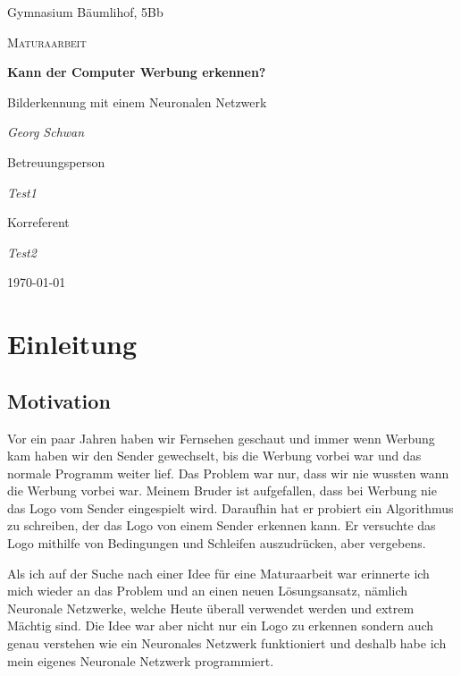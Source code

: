 \documentclass[12pt,a4paper]{report}
\begin{document}
\begin{titlepage}
	\centering
	{\Large Gymnasium Bäumlihof, 5Bb \par}
	\vspace{1cm}
	{\LARGE\scshape Maturaarbeit\par}
	\vspace{1.5cm}
	{\huge\bfseries Kann der Computer Werbung erkennen?\par}
	\vspace{0.6cm}
    {\Large Bilderkennung mit einem Neuronalen Netzwerk\par}
	\vspace{2cm}
	{\Large\itshape Georg Schwan\par}
	\vfill
	Betreuungsperson\par
	{\itshape Test1\par}
	Korreferent\par
	{\itshape Test2}
	\vfill
	{\large \today\par}
\end{titlepage}

\tableofcontents

\newpage

\chapter{Einleitung}\label{ch:einleitung}

\section{Motivation}
\label{sec:motivation}
Vor ein paar Jahren haben wir Fernsehen geschaut und immer wenn Werbung kam haben wir den Sender gewechselt,
bis die Werbung vorbei war und das normale Programm weiter lief.
Das Problem war nur, dass wir nie wussten wann die Werbung vorbei war.
Meinem Bruder ist aufgefallen, dass bei Werbung nie das Logo vom Sender eingespielt wird.
Daraufhin hat er probiert ein Algorithmus zu schreiben, der das Logo von einem Sender erkennen kann.
Er versuchte das Logo mithilfe von Bedingungen und Schleifen auszudrücken, aber vergebens.

Als ich auf der Suche nach einer Idee für eine Maturaarbeit war erinnerte ich mich wieder an das Problem und an einen neuen Lösungsansatz,
nämlich Neuronale Netzwerke, welche Heute überall verwendet werden und extrem Mächtig sind.
Die Idee war aber nicht nur ein Logo zu erkennen sondern auch genau verstehen wie ein Neuronales Netzwerk funktioniert
und deshalb habe ich mein eigenes Neuronale Netzwerk programmiert.
\end{document}
